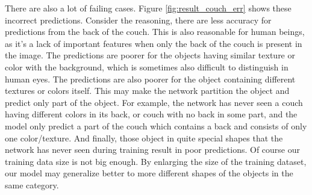 There are also a lot of failing cases. Figure \ref{fig:result_couch_err} shows these incorrect predictions. Consider the reasoning, there are less accuracy for predictions from the back of the couch. This is also reasonable for human beings, as it's a lack of important features when only the back of the couch is present in the image. The predictions are poorer for the objects having similar texture or color with the background, which is sometimes also difficult to distinguish in human eyes. The predictions are also poorer for the object containing different textures or colors itself. This may make the network partition the object and predict only part of the object. For example, the network has never seen a couch having different colors in its back, or couch with no back in some part, and the model only predict a part of the couch which contains  a back and consists of only one color/texture. And finally, those object in quite special shapes that the network has never seen during training result in poor predictions. Of course our training data size is not big enough. By enlarging the size of the training dataset, our model  may generalize better to more different shapes of the objects in the same category.

